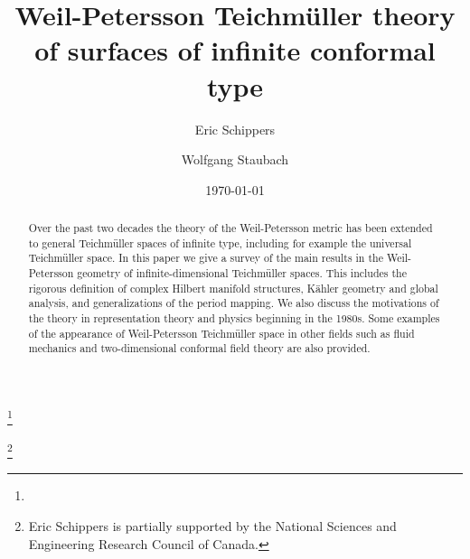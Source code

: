\documentclass[12pt]{amsart}
\theoremstyle{plain}
\theoremstyle{definition}
\theoremstyle{remark}
\numberwithin{equation}{section} %
\numberwithin{figure}{section} %
\begin{document}
\title[Weil-Petersson]{Weil-Petersson Teichm\"uller theory of surfaces of infinite conformal type}

\author{Eric Schippers}
\address{Eric Schippers \\ Department of Mathematics \\
University of Manitoba\\
Winnipeg, Manitoba \\  R3T 2N2 \\ Canada}
\thanks{}

\author{Wolfgang Staubach}
\address{Wolfgang Staubach\\ Department of Mathematics\\
Uppsala University\\
Box 480\\ 751 06 Uppsala\\ Sweden}



\date{\today}


\begin{abstract}
 Over the past two decades the theory of the Weil-Petersson metric has been extended to general Teichm\"uller spaces of infinite type, including for example the universal Teichm\"uller space. 
 In this paper we give a survey of the main results in the Weil-Petersson geometry of infinite-dimensional Teichm\"uller spaces. This includes the rigorous definition of complex Hilbert manifold structures, K\"ahler geometry and global analysis, and generalizations of the period mapping. We also discuss the motivations of the theory in representation theory and physics beginning in the 1980s. Some examples of the appearance of Weil-Petersson Teichm\"uller space in other fields such as fluid mechanics and two-dimensional conformal field theory are also provided.
\end{abstract}

\thanks{Eric Schippers is partially supported by the National Sciences and Engineering Research Council of Canada. }
\end{document}
